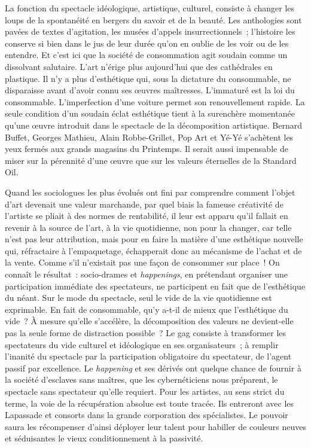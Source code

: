 \documentclass[french,twoside]{book} %
\begin{document}
La fonction du spectacle idéologique, artistique, culturel, consiste à changer les loups de la spontanéité en bergers du savoir et de la beauté. Les anthologies sont pavées de textes d’agitation, les musées d’appels insurrectionnels ; l’histoire les conserve si bien dans le jus de leur durée qu’on en oublie de les voir ou de les entendre. Et c’est ici que la société de consommation agit soudain comme un dissolvant salutaire. L’art n’érige plus aujourd’hui que des cathédrales en plastique. Il n’y a plus d’esthétique qui, sous la dictature du consommable, ne disparaisse avant d’avoir connu ses œuvres maîtresses. L’immaturé est la loi du consommable. L’imperfection d’une voiture permet son renouvellement rapide. La seule condition d’un soudain éclat esthétique tient à la surenchère momentanée qu’une œuvre introduit dans le spectacle de la décomposition artistique. Bernard Buffet, Georges Mathieu, Alain Robbe-Grillet, Pop Art et Yé-Yé s’achètent les yeux fermés aux grands magasins du Printemps. Il serait aussi impensable de miser sur la pérennité d’une œuvre que sur les valeurs éternelles de la Standard Oil.\par
Quand les sociologues les plus évolués ont fini par comprendre comment l’objet d’art devenait une valeur marchande, par quel biais la fameuse créativité de l’artiste se pliait à des normes de rentabilité, il leur est apparu qu’il fallait en revenir à la source de l’art, à la vie quotidienne, non pour la changer, car telle n’est pas leur attribution, mais pour en faire la matière d’une esthétique nouvelle qui, réfractaire à l’empaquetage, échapperait donc au mécanisme de l’achat et de la vente. Comme s’il n’existait pas une façon de consommer sur place ! On connaît le résultat : socio-drames et \emph{happenings}, en prétendant organiser une participation immédiate des spectateurs, ne participent en fait que de l’esthétique du néant. Sur le mode du spectacle, seul le vide de la vie quotidienne est exprimable. En fait de consommable, qu’y a-t-il de mieux que l’esthétique du vide ? À mesure qu’elle s’accélère, la décomposition des valeurs ne devient-elle pas la seule forme de distraction possible ? Le gag consiste à transformer les spectateurs du vide culturel et idéologique en ses organisateurs ; à remplir l’inanité du spectacle par la participation obligatoire du spectateur, de l’agent passif par excellence. Le \emph{happening} et ses dérivés ont quelque chance de fournir à la société d’esclaves sans maîtres, que les cybernéticiens nous préparent, le spectacle sans spectateur qu’elle requiert. Pour les artistes, au sens strict du terme, la voie de la récupération absolue est toute tracée. Ils entreront avec les Lapassade et consorts dans la grande corporation des spécialistes. Le pouvoir saura les récompenser d’ainsi déployer leur talent pour habiller de couleurs neuves et séduisantes le vieux conditionnement à la passivité.\par
\end{document}
